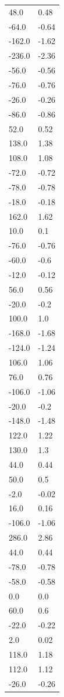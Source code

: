 \begin{longtable}{ll}
48.0 & 0.48 \\
-64.0 & -0.64 \\
-162.0 & -1.62 \\
-236.0 & -2.36 \\
-56.0 & -0.56 \\
-76.0 & -0.76 \\
-26.0 & -0.26 \\
-86.0 & -0.86 \\
52.0 & 0.52 \\
138.0 & 1.38 \\
108.0 & 1.08 \\
-72.0 & -0.72 \\
-78.0 & -0.78 \\
-18.0 & -0.18 \\
162.0 & 1.62 \\
10.0 & 0.1 \\
-76.0 & -0.76 \\
-60.0 & -0.6 \\
-12.0 & -0.12 \\
56.0 & 0.56 \\
-20.0 & -0.2 \\
100.0 & 1.0 \\
-168.0 & -1.68 \\
-124.0 & -1.24 \\
106.0 & 1.06 \\
76.0 & 0.76 \\
-106.0 & -1.06 \\
-20.0 & -0.2 \\
-148.0 & -1.48 \\
122.0 & 1.22 \\
130.0 & 1.3 \\
44.0 & 0.44 \\
50.0 & 0.5 \\
-2.0 & -0.02 \\
16.0 & 0.16 \\
-106.0 & -1.06 \\
286.0 & 2.86 \\
44.0 & 0.44 \\
-78.0 & -0.78 \\
-58.0 & -0.58 \\
0.0 & 0.0 \\
60.0 & 0.6 \\
-22.0 & -0.22 \\
2.0 & 0.02 \\
118.0 & 1.18 \\
112.0 & 1.12 \\
-26.0 & -0.26 \\

\end{longtable}
